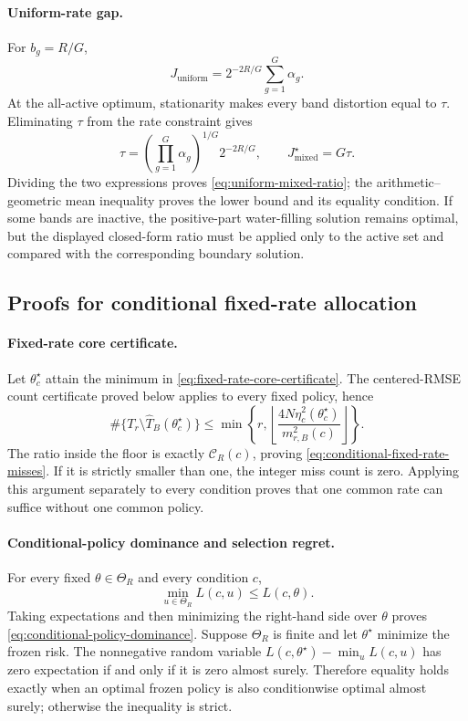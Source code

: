\paragraph{Uniform-rate gap.}
For $b_g=R/G$,
\begin{equation}
 J_{\mathrm{uniform}}
 =2^{-2R/G}\sum_{g=1}^{G}\alpha_g.
\end{equation}
At the all-active optimum, stationarity makes every band distortion equal
to $\tau$.  Eliminating $\tau$ from the rate constraint gives
\begin{equation}
 \tau=(\prod_{g=1}^{G}\alpha_g)^{1/G}2^{-2R/G},
 \qquad
 J_{\mathrm{mixed}}^\star=G\tau.
\end{equation}
Dividing the two expressions proves
\cref{eq:uniform-mixed-ratio}; the arithmetic--geometric mean inequality
proves the lower bound and its equality condition.  If some bands are
inactive, the positive-part water-filling solution remains optimal, but the
displayed closed-form ratio must be applied only to the active set and
compared with the corresponding boundary solution.

\subsection{Proofs for conditional fixed-rate allocation}

\paragraph{Fixed-rate core certificate.}
Let $\theta_c^\star$ attain the minimum in
\cref{eq:fixed-rate-core-certificate}.  The centered-RMSE count certificate
proved below applies to every fixed policy, hence
\begin{equation}
 \#\{T_r\setminus\widehat T_B(\theta_c^\star)\}
 \le
 \min\!\left\{
 r,
 \left\lfloor
 \frac{4N\eta_c^2(\theta_c^\star)}
 {m_{r,B}^2(c)}
 \right\rfloor
 \right\}.
\end{equation}
The ratio inside the floor is exactly $\mathcal C_R(c)$, proving
\cref{eq:conditional-fixed-rate-misses}.  If it is strictly smaller than
one, the integer miss count is zero.  Applying this argument separately to
every condition proves that one common rate can suffice without one common
policy.

\paragraph{Conditional-policy dominance and selection regret.}
For every fixed $\theta\in\Theta_R$ and every condition $c$,
\begin{equation}
 \min_{u\in\Theta_R}L(c,u)\leq L(c,\theta).
\end{equation}
Taking expectations and then minimizing the right-hand side over $\theta$
proves \cref{eq:conditional-policy-dominance}.  Suppose $\Theta_R$ is
finite and let $\theta^\star$ minimize the frozen risk.  The nonnegative
random variable
$L(c,\theta^\star)-\min_uL(c,u)$ has zero expectation if and only if it is
zero almost surely.  Therefore equality holds exactly when an optimal
frozen policy is also conditionwise optimal almost surely; otherwise the
inequality is strict.

